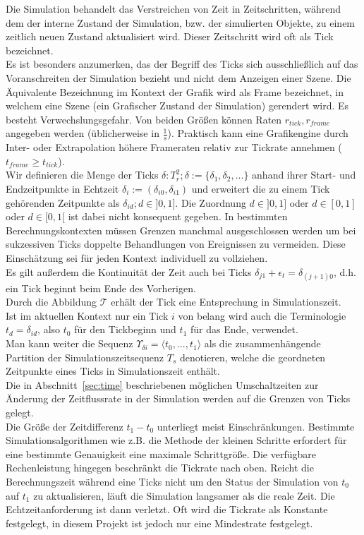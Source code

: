 
Die Simulation behandelt das Verstreichen von Zeit in Zeitschritten, während dem der interne Zustand der Simulation, bzw. der simulierten Objekte, zu einem zeitlich neuen Zustand aktualisiert wird.
Dieser Zeitschritt wird oft als Tick bezeichnet.\\

Es ist besonders anzumerken, das der Begriff des Ticks sich ausschließlich auf das Voranschreiten der Simulation bezieht und nicht dem Anzeigen einer Szene. Die Äquivalente Bezeichnung im Kontext der Grafik wird als Frame bezeichnet, in welchem eine Szene (ein Grafischer Zustand der Simulation) gerendert wird. Es besteht Verwechslungsgefahr. Von beiden Größen können Raten $r_{tick}, r_{frame}$ angegeben werden (üblicherweise in $\frac{1}{s}$). Praktisch kann eine Grafikengine durch Inter- oder Extrapolation höhere Frameraten relativ zur Tickrate annehmen ($t_{frame}\geq t_{tick}$).\\
Wir definieren die Menge der Ticks $\delta:T_r^2; \delta:=\{\delta_1, \delta_2, ...\}$ anhand ihrer Start- und Endzeitpunkte in Echtzeit $\delta_i := (\delta_{i0}, \delta_{i1})$ und erweitert die zu einem Tick gehörenden Zeitpunkte als $\delta_{id}; d \in ]0,1]$. Die Zuordnung $d \in ]0,1]$ oder  $d \in [0,1]$ oder $d \in [0,1[$ ist dabei nicht konsequent gegeben. In bestimmten Berechnungskontexten müssen Grenzen manchmal ausgeschlossen werden um bei sukzessiven Ticks doppelte Behandlungen von Ereignissen zu vermeiden. Diese Einschätzung sei für jeden Kontext individuell zu vollziehen.\\
Es gilt außerdem die Kontinuität der Zeit auch bei Ticks $\delta_{j1} + \epsilon_t = \delta_{(j+1)0}$, d.h. ein Tick beginnt beim Ende des Vorherigen.\\
Durch die Abbildung $\mathcal{T}$ erhält der Tick eine Entsprechung in Simulationszeit.\\
Ist im aktuellen Kontext nur ein Tick $i$ von belang wird auch die Terminologie $t_d = \delta_{id}$, also $t_0$ für den Tickbeginn und $t_1$ für das Ende, verwendet.\\
Man kann weiter die Sequenz $\Upsilon_{\delta i} = \langle t_0, ...,  t_1\rangle$ als die zusammenhängende Partition der Simulationszeitsequenz $T_s$ denotieren, welche die geordneten Zeitpunkte eines Ticks in Simulationszeit enthält.\\
Die in Abschnitt~\ref{sec:time} beschriebenen möglichen Umschaltzeiten zur Änderung der Zeitflussrate in der Simulation werden auf die Grenzen von Ticks gelegt.\\
Die Größe der Zeitdifferenz $t_1 - t_0$ unterliegt meist Einschränkungen. Bestimmte Simulationsalgorithmen wie z.B. die Methode der kleinen Schritte erfordert für eine bestimmte Genauigkeit eine maximale Schrittgröße. Die verfügbare Rechenleistung hingegen beschränkt die Tickrate nach oben. Reicht die Berechnungszeit während eine Ticks nicht um den Status der Simulation von $t_0$ auf $t_1$ zu aktualisieren, läuft die Simulation langsamer als die reale Zeit. Die Echtzeitanforderung ist dann verletzt. Oft wird die Tickrate als Konstante festgelegt, in diesem Projekt ist jedoch nur eine Mindestrate festgelegt.
